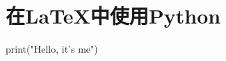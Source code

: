 \documentclass{ctexart}
\begin{document}
  \section{在LaTeX中使用Python}

  \begin{pycode} 
print("Hello, it's me")
  \end{pycode}

\end{document}
